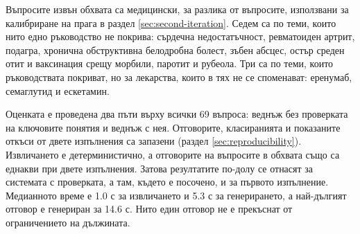 \documentclass[12pt,a4paper]{article}
\makeatletter
\renewcommand\paragraph{\@startsection{paragraph}{4}{\z@}{1.5ex \@plus .5ex \@minus .2ex}{-1em}{\normalfont\normalsize\bfseries}}
\makeatother
\begin{document}
Въпросите извън обхвата са медицински, за разлика от въпросите, използвани за калибриране на прага в раздел \ref{sec:second-iteration}. Седем са по теми, които нито едно ръководство не покрива: сърдечна недостатъчност, ревматоиден артрит, подагра, хронична обструктивна белодробна болест, зъбен абсцес, остър среден отит и ваксинация срещу морбили, паротит и рубеола. Три са по теми, които ръководствата покриват, но за лекарства, които в тях не се споменават: еренумаб, семаглутид и ескетамин.

\paragraph{Провеждане.} Оценката е проведена два пъти върху всички 69 въпроса: веднъж без проверката на ключовите понятия и веднъж с нея. Отговорите, класиранията и показаните откъси от двете изпълнения са запазени (раздел \ref{sec:reproducibility}). Извличането е детерминистично, а отговорите на въпросите в обхвата също са еднакви при двете изпълнения. Затова резултатите по-долу се отнасят за системата с проверката, а там, където е посочено, и за първото изпълнение. Медианното време е 1.0 с за извличането и 5.3 с за генерирането, а най-дългият отговор е генериран за 14.6 с. Нито един отговор не е прекъснат от ограничението на дължината.
\end{document}
